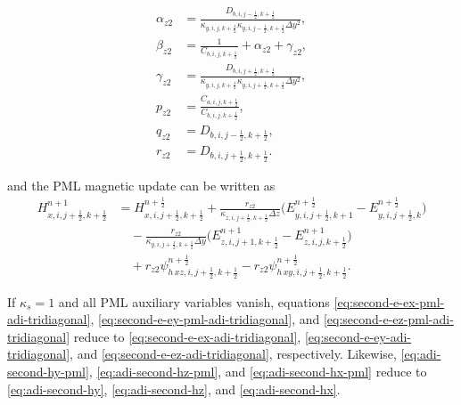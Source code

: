 \documentclass{article}
\numberwithin{equation}{section}
\numberwithin{figure}{section}
\begin{document}
\begin{align}
    \alpha_{z2} & =\frac{D_{b,i,j-\tfrac12,k+\tfrac12}}{\kappa_{y,i,j,k+\tfrac12}\kappa_{y,i,j-\tfrac12,k+\tfrac12}\Delta y^2}, \\
    \beta_{z2}  & =\frac{1}{C_{b,i,j,k+\tfrac12}}+\alpha_{z2}+\gamma_{z2},                                                      \\
    \gamma_{z2} & =\frac{D_{b,i,j+\tfrac12,k+\tfrac12}}{\kappa_{y,i,j,k+\tfrac12}\kappa_{y,i,j+\tfrac12,k+\tfrac12}\Delta y^2}, \\
    p_{z2}      & =\frac{C_{a,i,j,k+\tfrac12}}{C_{b,i,j,k+\tfrac12}},                                                           \\
    q_{z2}      & =D_{b,i,j-\tfrac12,k+\tfrac12},                                                                               \\
    r_{z2}      & =D_{b,i,j+\tfrac12,k+\tfrac12}.
\end{align}

and the PML magnetic update can be written as
\begin{equation}
    \begin{aligned}
        H_{x,i,j+\tfrac12,k+\tfrac12}^{n+1}
         & = H_{x,i,j+\tfrac12,k+\tfrac12}^{n+\frac12}
        +\frac{r_{z2}}{\kappa_{z,i,j+\tfrac12,k+\tfrac12}\Delta z}
        \Big(E_{y,i,j+\tfrac12,k+1}^{n+\frac12}-E_{y,i,j+\tfrac12,k}^{n+\frac12}\Big) \\
         & \quad
        -\frac{r_{z2}}{\kappa_{y,i,j+\tfrac12,k+\tfrac12}\Delta y}
        \Big(E_{z,i,j+1,k+\tfrac12}^{n+1}-E_{z,i,j,k+\tfrac12}^{n+1}\Big)             \\
         & \quad
        +r_{z2}\psi^{n+\frac12}_{h\,xz,i,j+\tfrac12,k+\tfrac12}
        -r_{z2}\psi^{n+\frac12}_{h\,xy,i,j+\tfrac12,k+\tfrac12}.
    \end{aligned}
    \label{eq:adi-second-hx-pml}
\end{equation}

If $\kappa_s=1$ and all PML auxiliary variables vanish, equations \eqref{eq:second-e-ex-pml-adi-tridiagonal}, \eqref{eq:second-e-ey-pml-adi-tridiagonal}, and \eqref{eq:second-e-ez-pml-adi-tridiagonal} reduce to \eqref{eq:second-e-ex-adi-tridiagonal}, \eqref{eq:second-e-ey-adi-tridiagonal}, and \eqref{eq:second-e-ez-adi-tridiagonal}, respectively. Likewise, \eqref{eq:adi-second-hy-pml}, \eqref{eq:adi-second-hz-pml}, and \eqref{eq:adi-second-hx-pml} reduce to \eqref{eq:adi-second-hy}, \eqref{eq:adi-second-hz}, and \eqref{eq:adi-second-hx}.
\end{document}

